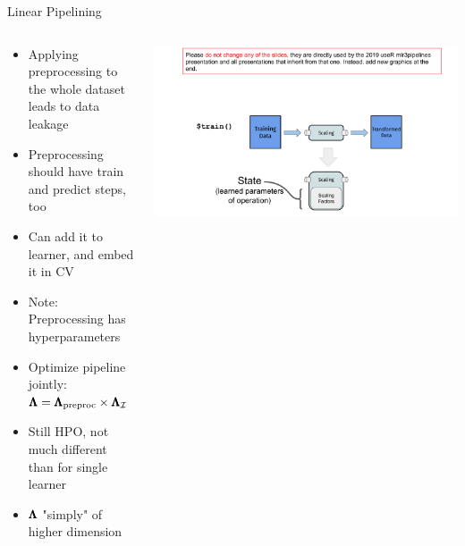 

\usepackage[normalem]{ulem}
\usepackage{pifont}
\usepackage{relsize}
\renewcommand{\lit}[1]{{\smaller\color{black!60}[#1]}}
\subtitle{Practical Problems}



	
	\maketitle
	
    \begin{frame}{Linear Pipelining}
		
		
		
		
		\begin{columns}
			\begin{column}{0.5\textwidth}
				\begin{itemize}
					\item Applying preprocessing to the whole dataset leads to data leakage
					\item Preprocessing should have train and predict steps, too
					\item Can add it to learner, and embed it in CV    
					\item Note: Preprocessing has hyperparameters 
					\item Optimize pipeline jointly: $\pmb{\Lambda} = \pmb{\Lambda}_{\text{preproc}} \times \pmb{\Lambda}_{\mathcal{I}}$ 
					\item Still HPO, not much different than for single learner
					\item $\pmb{\Lambda}$ "simply" of higher dimension
				\end{itemize}
			\end{column}%
			\begin{column}{0.5\textwidth}
				\begin{center}
					\includegraphics[page=19, width=\textwidth, trim=20 60 30 35, clip]{images/mlr3Pipelines_graphics}
				\end{center}
			\end{column}
		\end{columns}
		
	\end{frame}
	

